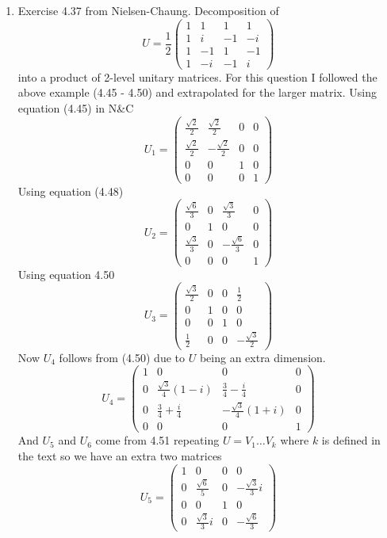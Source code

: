 \documentclass[12pt]{article}
\begin{document}
\begin{enumerate}
   
    \item Exercise 4.37 from Nielsen-Chaung. Decomposition of 
    $$ U =  \frac{1}{2} \left(\begin{array}{cccc} 1 & 1 & 1 & 1 \\  1 & i & -1 & -i \\ 1 & -1 & 1 & -1 \\ 1 & -i & -1 & i \end{array}\right)$$
    into a product of 2-level unitary matrices. For this question I followed the above example (4.45 - 4.50) and extrapolated for the larger matrix. Using equation (4.45) in N\&C 
    $$ U_1 = \left(\begin{array}{cccc} \frac{\sqrt{2}}{2} & \frac{\sqrt{2}}{2} & 0 & 0 \\  \frac{\sqrt{2}}{2} & - \frac{\sqrt{2}}{2} & 0 & 0 \\ 0 & 0 & 1 & 0 \\ 0 & 0 & 0 & 1 \end{array}\right)$$
    Using equation (4.48) 
    $$ U_2 = \left(\begin{array}{cccc} \frac{\sqrt{6}}{3} & 0 & \frac{\sqrt{3}}{3} & 0 \\  0 & 1 & 0 & 0 \\ \frac{\sqrt{3}}{3} & 0 & - \frac{\sqrt{6}}{3} & 0 \\ 0 & 0 & 0 & 1 \end{array}\right)$$
    Using equation 4.50 
    $$ U_3 = \left(\begin{array}{cccc} \frac{\sqrt{3}}{2} & 0 & 0 & \frac{1}{2} \\  0 & 1 & 0 & 0 \\ 0 & 0 & 1 & 0 \\ \frac{1}{2} & 0 & 0 & -\frac{\sqrt{3}}{2} \end{array}\right)$$
    Now $U_4$ follows from (4.50) due to $U$ being an extra dimension. 
    $$ U_4 = \left(\begin{array}{cccc} 1 & 0 & 0 & 0 \\  0 & \frac{\sqrt{3}}{4}(1-i) & \frac{3}{4} - \frac{i}{4} & 0 \\ 0 & \frac{3}{4} + \frac{i}{4} & - \frac{\sqrt{3}}{4}(1+i) & 0 \\ 0 & 0 & 0 & 1\end{array}\right)$$
    And $U_5$ and $U_6$ come from 4.51 repeating $U = V_1 \ldots V_k$ where $k$ is defined in the text so we have an extra two matrices
    $$ U_5 = \left(\begin{array}{cccc} 1 & 0 & 0 & 0 \\  0 & \frac{\sqrt{6}}{5} & 0 & - \frac{\sqrt{3}}{3}i \\ 0 & 0 & 1 & 0 \\ 0 & \frac{\sqrt{3}}{3}i & 0 & - \frac{\sqrt{6}}{3} \end{array}\right)$$

\end{enumerate}
\end{document}
